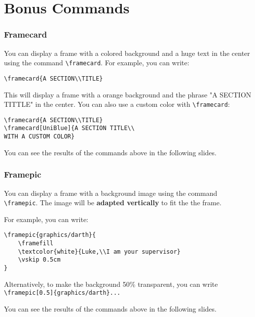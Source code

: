 \documentclass[usenames,dvipsnames]{beamer}
\newcommand{\framefill}{\vskip0pt plus 1filll}
\begin{document}
\section{Bonus Commands}

\begin{frame}[fragile]
\frametitle{Framecard}

You can display a frame with a colored background and a huge text in the center using the command \texttt{\textbackslash framecard}.
\vskip 0.5cm
For example, you can write:
\begin{verbatim}
\framecard{A SECTION\\TITLE}
\end{verbatim}

This will display a frame with a orange background and the phrase "A SECTION TITTLE" in the center. You can also use a custom color with \texttt{\textbackslash framecard}:
\begin{verbatim}
\framecard{A SECTION\\TITLE}
\framecard[UniBlue]{A SECTION TITLE\\
WITH A CUSTOM COLOR}
\end{verbatim}
You can see the results of the commands above in the following slides.

\end{frame}


\begin{frame}[fragile]
\frametitle{Framepic}

You can display a frame with a background image using the command \texttt{\textbackslash framepic}. The image will be \textbf{adapted vertically} to fit the the frame.

For example, you can write:
\begin{verbatim}
\framepic{graphics/darth}{
	\framefill
    \textcolor{white}{Luke,\\I am your supervisor}
    \vskip 0.5cm
}
\end{verbatim}

Alternatively, to make the background 50\% transparent, you can write \texttt{\textbackslash framepic[0.5]\{graphics/darth\}...}


You can see the results of the commands above in the following slides.

\end{frame}
\end{document}
